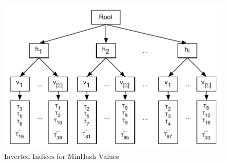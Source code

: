 \begin{figure}[t]
  \caption{Inverted Indices for MinHash Values}
  \label{InvIndices}
  \centering
    \includegraphics[width=0.7 \textwidth]{fig/invertedIdx.pdf}
\end{figure}


